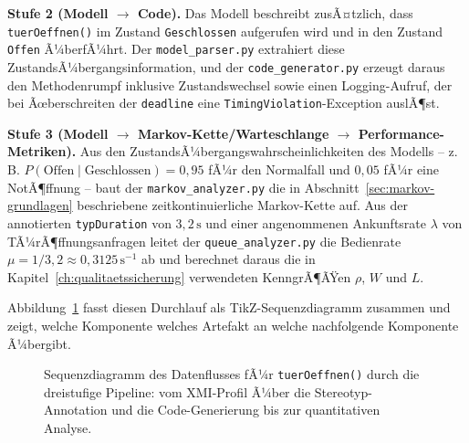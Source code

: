﻿\documentclass[a4paper,12pt]{report}
\theoremstyle{definition}
\begin{document}
\textbf{Stufe 2 (Modell $\to$ Code).} Das Modell beschreibt zusÃ¤tzlich, dass
\texttt{tuerOeffnen()} im Zustand \texttt{Geschlossen} aufgerufen wird und in
den Zustand \texttt{Offen} Ã¼berfÃ¼hrt. Der \texttt{model\_parser.py}
extrahiert diese ZustandsÃ¼bergangsinformation, und der
\texttt{code\_generator.py} erzeugt daraus den Methodenrumpf inklusive
Zustandswechsel sowie einen Logging-Aufruf, der bei Ãœberschreiten der
\texttt{deadline} eine \texttt{TimingViolation}-Exception auslÃ¶st.

\textbf{Stufe 3 (Modell $\to$ Markov-Kette/Warteschlange $\to$
Performance-Metriken).} Aus den ZustandsÃ¼bergangswahrscheinlichkeiten des
Modells -- z.\,B. $P(\text{Offen} \mid \text{Geschlossen}) = 0{,}95$ fÃ¼r den
Normalfall und $0{,}05$ fÃ¼r eine NotÃ¶ffnung -- baut der
\texttt{markov\_analyzer.py} die in Abschnitt~\ref{sec:markov-grundlagen}
beschriebene zeitkontinuierliche Markov-Kette auf. Aus der annotierten
\texttt{typDuration} von $3{,}2\,\text{s}$ und einer angenommenen
Ankunftsrate $\lambda$ von TÃ¼rÃ¶ffnungsanfragen leitet der
\texttt{queue\_analyzer.py} die Bedienrate $\mu = 1/3{,}2 \approx
0{,}3125\,\text{s}^{-1}$ ab und berechnet daraus die in
Kapitel~\ref{ch:qualitaetssicherung} verwendeten KenngrÃ¶ÃŸen $\rho$, $W$ und
$L$.

Abbildung~\ref{fig:pipeline-sequence} fasst diesen Durchlauf als
TikZ-Sequenzdiagramm zusammen und zeigt, welche Komponente welches Artefakt
an welche nachfolgende Komponente Ã¼bergibt.

\begin{figure}[H]
\centering
{}
\caption{Sequenzdiagramm des Datenflusses fÃ¼r \texttt{tuerOeffnen()} durch
die dreistufige Pipeline: vom XMI-Profil Ã¼ber die Stereotyp-Annotation und
die Code-Generierung bis zur quantitativen Analyse.}
\label{fig:pipeline-sequence}
\end{figure}
\end{document}
